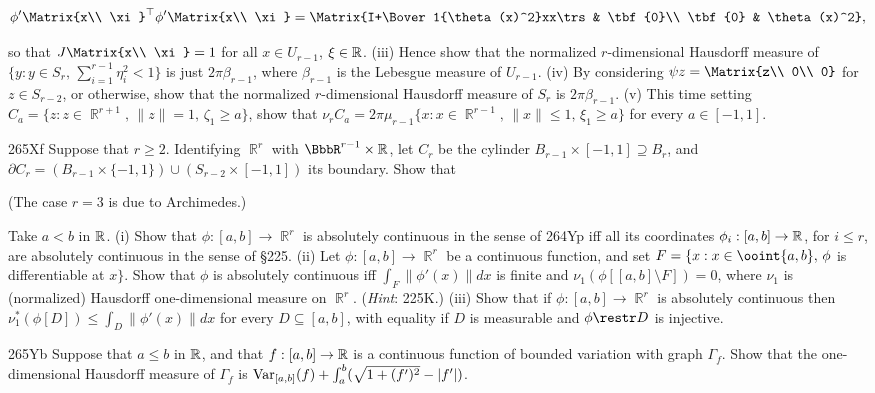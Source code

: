 {$$\phi'\Matrix{x\\ \xi}\trs \phi'\Matrix{x\\ \xi}
=\Matrix{I+\Bover1{\theta(x)^2}xx\trs  & \tbf{0}\\
        \tbf{0} & \theta(x)^2},$$

\noindent so that $J\Matrix{x\\ \xi}=1$ for all $x\in U_{r-1}$,
$\xi\in\Bbb R$.   (iii) Hence show that the normalized $r$-dimensional
Hausdorff measure of $\{y:y\in S_r,\,\sum_{i=1}^{r-1}\eta_i^2<1\}$ is
just $2\pi\beta_{r-1}$, where $\beta_{r-1}$ is the Lebesgue measure of
$U_{r-1}$.   (iv) By considering $\psi z=\Matrix{z\\ 0\\ 0}$ for
$z\in S_{r-2}$, or otherwise, show that the normalized $r$-dimensional
Hausdorff measure of $S_r$ is $2\pi\beta_{r-1}$.   (v) This time setting
$C_a=\{z:z\in\BbbR^{r+1},\,\|z\|=1,\,\zeta_1\ge a\}$, show that
$\nu_rC_a=2\pi\mu_{r-1}\{x:x\in\BbbR^{r-1},\,\|x\|\le 1,\,\xi_1\ge a\}$
for every $a\in[-1,1]$.

\spheader 265Xf Suppose that $r\ge 2$.   Identifying
$\BbbR^r$ with $\BbbR^{r-1}\times\Bbb R$, let $C_r$ be the cylinder
$B_{r-1}\times[-1,1]\supseteq B_r$, and 
$\partial C_r=(B_{r-1}\times\{-1,1\})\cup(S_{r-2}\times[-1,1])$ 
its boundary.   Show that 


\noindent(The case $r=3$ is due to Archimedes.)

Take $a<b$ in $\Bbb R$.   (i)
Show that $\phi:[a,b]\to\BbbR^r$ is absolutely continuous in the
sense of 264Yp iff all its coordinates
$\phi_i:[a,b]\to\Bbb R$, for $i\le r$, are absolutely continuous in
the sense of \S225.   (ii) Let $\phi:[a,b]\to\BbbR^r$
be a continuous function, and set $F=\{x:x\in\ooint{a,b},\,\phi$ is
differentiable at $x\}$.    Show that $\phi$ is absolutely continuous
iff $\int_F\|\phi'(x)\|dx$ is finite and
$\nu_1(\phi[[a,b]\setminus F])=0$, where $\nu_1$ is (normalized)
Hausdorff one-dimensional measure on $\BbbR^r$.   ({\it Hint\/}:
225K.)   (iii) Show that if $\phi:[a,b]\to\BbbR^r$ is
absolutely continuous then $\nu_1^*(\phi[D])\le\int_D\|\phi'(x)\|dx$
for
every $D\subseteq[a,b]$, with equality if $D$ is measurable and
$\phi\restr D$ is injective.

\spheader 265Yb Suppose that $a\le b$ in $\Bbb R$, and that
$f:[a,b]\to\Bbb R$ is a continuous function of bounded variation with
graph $\Gamma_f$.   Show that the one-dimensional Hausdorff measure
of $\Gamma_f$ is $\mathop{\text{Var}}_{[a,b]}(f)+\int_a^b(\sqrt{1+(f')^2}-|f'|)$.
}%

